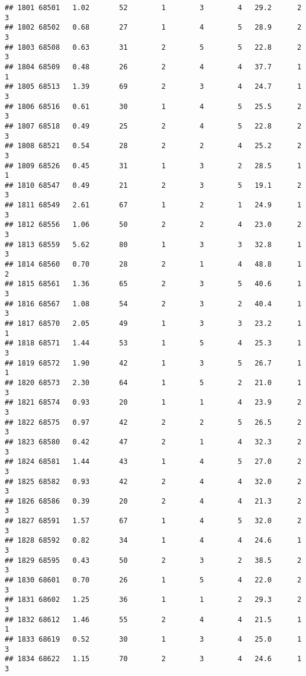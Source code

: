 \documentclass[
]{article}
\begin{document}
\begin{verbatim}
## 1801 68501   1.02       52        1        3        4   29.2      2      3
## 1802 68502   0.68       27        1        4        5   28.9      2      3
## 1803 68508   0.63       31        2        5        5   22.8      2      3
## 1804 68509   0.48       26        2        4        4   37.7      1      1
## 1805 68513   1.39       69        2        3        4   24.7      1      3
## 1806 68516   0.61       30        1        4        5   25.5      2      3
## 1807 68518   0.49       25        2        4        5   22.8      2      3
## 1808 68521   0.54       28        2        2        4   25.2      2      3
## 1809 68526   0.45       31        1        3        2   28.5      1      1
## 1810 68547   0.49       21        2        3        5   19.1      2      3
## 1811 68549   2.61       67        1        2        1   24.9      1      3
## 1812 68556   1.06       50        2        2        4   23.0      2      3
## 1813 68559   5.62       80        1        3        3   32.8      1      3
## 1814 68560   0.70       28        2        1        4   48.8      1      2
## 1815 68561   1.36       65        2        3        5   40.6      1      3
## 1816 68567   1.08       54        2        3        2   40.4      1      3
## 1817 68570   2.05       49        1        3        3   23.2      1      1
## 1818 68571   1.44       53        1        5        4   25.3      1      3
## 1819 68572   1.90       42        1        3        5   26.7      1      1
## 1820 68573   2.30       64        1        5        2   21.0      1      3
## 1821 68574   0.93       20        1        1        4   23.9      2      3
## 1822 68575   0.97       42        2        2        5   26.5      2      3
## 1823 68580   0.42       47        2        1        4   32.3      2      3
## 1824 68581   1.44       43        1        4        5   27.0      2      3
## 1825 68582   0.93       42        2        4        4   32.0      2      3
## 1826 68586   0.39       20        2        4        4   21.3      2      3
## 1827 68591   1.57       67        1        4        5   32.0      2      3
## 1828 68592   0.82       34        1        4        4   24.6      1      3
## 1829 68595   0.43       50        2        3        2   38.5      2      3
## 1830 68601   0.70       26        1        5        4   22.0      2      3
## 1831 68602   1.25       36        1        1        2   29.3      2      3
## 1832 68612   1.46       55        2        4        4   21.5      1      1
## 1833 68619   0.52       30        1        3        4   25.0      1      3
## 1834 68622   1.15       70        2        3        4   24.6      1      3

\end{verbatim}
\end{document}
